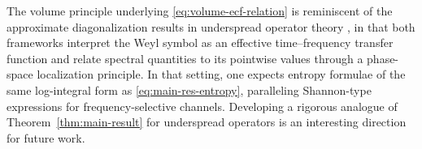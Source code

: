 \documentclass[a4paper,12pt]{article}
\newcommand{\symbolnot}{\sigma}
\begin{document}

The volume principle underlying \eqref{eq:volume-ecf-relation} is reminiscent of the
approximate diagonalization results in underspread operator theory
\cite{kailath1963timevariant, bello1969measurement, pfander2006measurement,
durisi2008noncoherent, heckel2013identification, matz1998time, matz2013time}, in that
both frameworks interpret the Weyl symbol as an effective time--frequency transfer
function and relate spectral quantities to its pointwise values through a
phase-space localization principle.
In that setting, one expects entropy formulae of the same log-integral form as \eqref{eq:main-res-entropy}, paralleling Shannon-type expressions for frequency-selective channels. Developing a rigorous analogue of Theorem~\ref{thm:main-result} for underspread operators is an interesting direction for future work.

\end{document}
